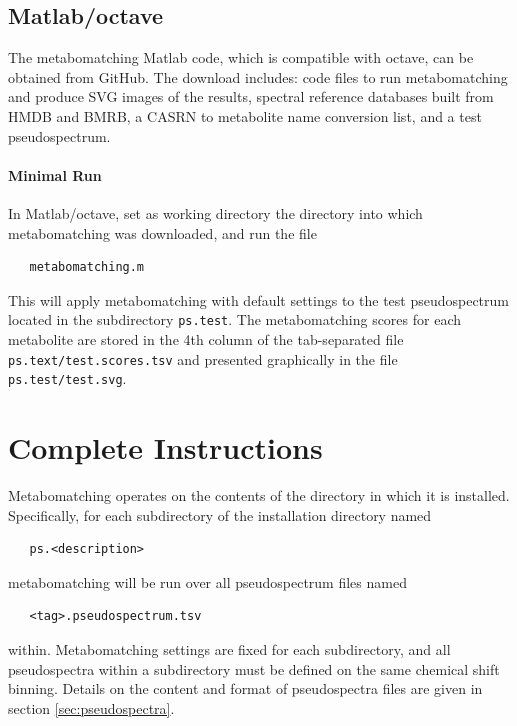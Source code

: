 \documentclass[a4paper,11pt]{article}
\begin{document}
\subsection{Matlab/octave}
The metabomatching Matlab code, which is compatible with octave, can be obtained from GitHub. The download includes: code files to run metabomatching and produce SVG images of the results, spectral reference databases built from HMDB and BMRB, a CASRN to metabolite name conversion list, and a test pseudospectrum.
\paragraph{Minimal Run} In Matlab/octave, set as working directory the directory into which metabomatching was downloaded, and run the file
\begin{verbatim}
   metabomatching.m
\end{verbatim}
This will apply metabomatching with default settings to the test pseudospectrum located in the subdirectory \verb|ps.test|. The metabomatching scores for each metabolite are stored in the 4th column of the tab-separated file \verb|ps.text/test.scores.tsv| and presented graphically in the file \verb|ps.test/test.svg|.
\clearpage
\section{Complete Instructions}
Metabomatching operates on the contents of the directory in which it is installed. Specifically, for each subdirectory of the installation directory named \begin{verbatim}
   ps.<description>
\end{verbatim}
metabomatching will be run over all pseudospectrum files named
\begin{verbatim}
   <tag>.pseudospectrum.tsv
\end{verbatim}
within. Metabomatching settings are fixed for each subdirectory, and all pseudospectra within a subdirectory must be defined on the same chemical shift binning. Details on the content and format of pseudospectra files are given in section \ref{sec:pseudospectra}.
\end{document}
